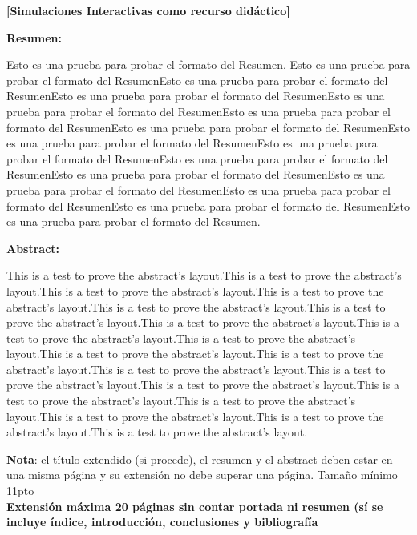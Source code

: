 \documentclass[11pt, a4paper]{article} %
\theoremstyle{named}
\begin{document}
{\bfseries \large [Simulaciones Interactivas como recurso didáctico] }\vspace{10mm}

{\bfseries \large Resumen:} \vspace{5mm}

Esto es una prueba para probar el formato del Resumen. Esto es una prueba para probar el formato del ResumenEsto es una prueba para probar el formato del ResumenEsto es una prueba para probar el formato del ResumenEsto es una prueba para probar el formato del ResumenEsto es una prueba para probar el formato del ResumenEsto es una prueba para probar el formato del ResumenEsto es una prueba para probar el formato del ResumenEsto es una prueba para probar el formato del ResumenEsto es una prueba para probar el formato del ResumenEsto es una prueba para probar el formato del ResumenEsto es una prueba para probar el formato del ResumenEsto es una prueba para probar el formato del ResumenEsto es una prueba para probar el formato del ResumenEsto es una prueba para probar el formato del Resumen.
\vspace{1cm}

{\bfseries \large Abstract: }\vspace{5mm}

This is a test to prove the abstract's layout.This is a test to prove the abstract's layout.This is a test to prove the abstract's layout.This is a test to prove the abstract's layout.This is a test to prove the abstract's layout.This is a test to prove the abstract's layout.This is a test to prove the abstract's layout.This is a test to prove the abstract's layout.This is a test to prove the abstract's layout.This is a test to prove the abstract's layout.This is a test to prove the abstract's layout.This is a test to prove the abstract's layout.This is a test to prove the abstract's layout.This is a test to prove the abstract's layout.This is a test to prove the abstract's layout.This is a test to prove the abstract's layout.This is a test to prove the abstract's layout.This is a test to prove the abstract's layout.This is a test to prove the abstract's layout.
\vspace{1cm}

{\Large\textbf{Nota}: el título extendido (si procede), el resumen y el abstract deben estar en una misma página y su extensión no debe superar una página. Tamaño mínimo 11pto }\\

{\Large\textbf{Extensión máxima 20 páginas sin contar portada ni resumen (sí se incluye índice, introducción, conclusiones y bibliografía}}
\newpage
\end{document}

